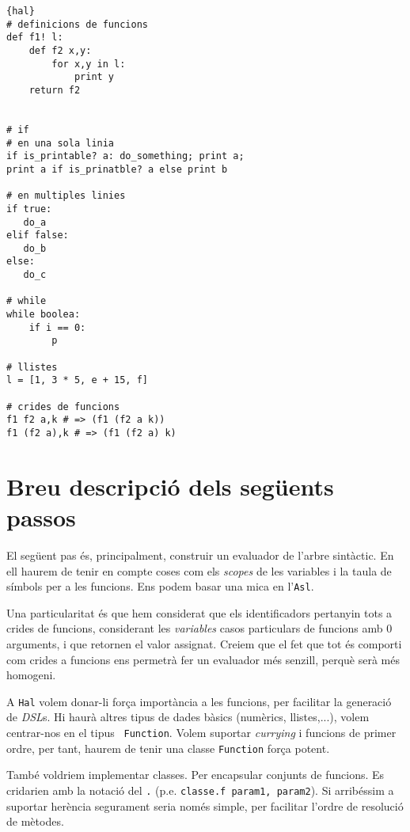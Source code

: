 \documentclass[a4paper,11pt]{article}
\newcommand{\asl}{{\tt Asl}}
\newcommand{\hal}{{\tt Hal}}
\begin{document}
\begin{lstlisting}{hal}
# definicions de funcions
def f1! l:
    def f2 x,y:
        for x,y in l:
            print y
    return f2


# if
# en una sola linia
if is_printable? a: do_something; print a;
print a if is_prinatble? a else print b

# en multiples linies
if true:
   do_a
elif false:
   do_b
else:
   do_c

# while
while boolea:
    if i == 0:
        p

# llistes
l = [1, 3 * 5, e + 15, f]

# crides de funcions
f1 f2 a,k # => (f1 (f2 a k))
f1 (f2 a),k # => (f1 (f2 a) k)
\end{lstlisting}


\section{Breu descripció dels següents passos}
El següent pas és, principalment, construir un evaluador de l'arbre sintàctic.
En ell haurem de tenir en compte coses com els \emph{scopes} de les variables
i la taula de símbols per a les funcions. Ens podem basar una mica en l'\asl.

Una particularitat és que hem considerat que els identificadors
pertanyin tots a crides de funcions, considerant les \emph{variables}
casos particulars de funcions amb 0 arguments, i que retornen el valor
assignat. Creiem que el fet que tot és comporti com crides a funcions ens permetrà
fer un evaluador més senzill, perquè serà més homogeni.

A \hal{} volem donar-li força importància a les funcions, per
facilitar la generació de \emph{DSL}s. Hi haurà altres tipus de dades
bàsics (numèrics, llistes,...), volem centrar-nos en el tipus {\tt
  Function}.  Volem suportar \emph{currying} i funcions de primer
ordre, per tant, haurem de tenir una classe {\tt Function} força
potent.

També voldriem implementar classes. Per encapsular conjunts de
funcions. Es cridarien amb la notació del {\tt .} (p.e. {\tt classe.f
  param1, param2}). Si arribéssim a suportar herència segurament seria
només simple, per facilitar l'ordre de resolució de mètodes.
\end{document}

